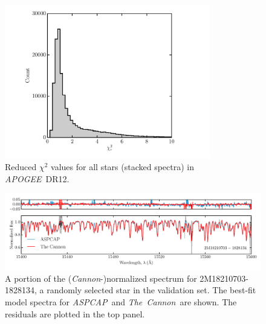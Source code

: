 \documentclass[12pt,preprint]{aastex}
\newcommand{\project}[1]{\textsl{#1}}
\newcommand{\TheCannon}{\project{The~Cannon}}
\newcommand{\acronym}[1]{{\small{#1}}}
\newcommand{\apogee}{\project{\acronym{APOGEE}}}
\newcommand{\aspcap}{\project{\acronym{ASPCAP}}}
\newcommand{\dr}{\acronym{DR12}}
\begin{document}
\begin{figure}[p]
\centering
\includegraphics[width=0.8\textwidth]{test-step-chisq.pdf}
\caption{Reduced $\chi^2$ values for all stars (stacked spectra) in \apogee\ \dr.\label{fig:chisq-test set}}
\end{figure}

\clearpage

\begin{figure}[p]
\centering
\includegraphics[width=\textwidth]{spectrum.pdf}
\caption{A portion of the (\emph{Cannon}-)normalized spectrum for 2M18210703-1828134,
a randomly selected star in the validation set.  The best-fit model spectra
for \aspcap\ and \TheCannon\ are shown. The residuals are plotted in the top panel.\label{fig:correctness}}
\end{figure}

\clearpage
\end{document}
